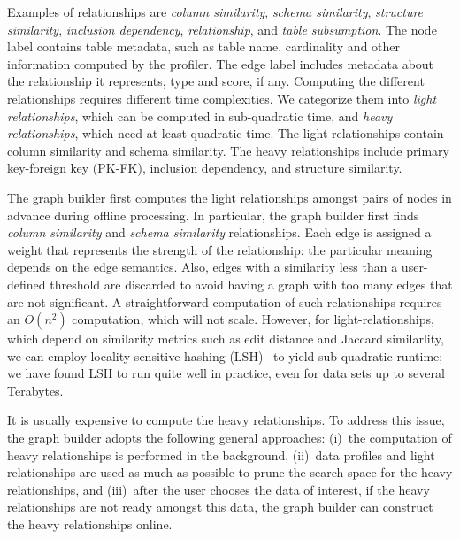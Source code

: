 Examples of relationships are 
\emph{column similarity}, 
\emph{schema similarity}, 
\emph{structure similarity}, %
\emph{inclusion dependency}, 
\emph{\pkfk relationship}, and
\emph{table subsumption}. 
The node label contains table metadata, such as table name, cardinality and
other information computed by the profiler. The edge label includes metadata
about the relationship it represents, \eg type and score, if any. Computing the
different relationships requires different time complexities. We categorize them
into \textit{light relationships}, which can be computed in sub-quadratic time,
and \textit{heavy relationships}, which need at least quadratic time. The light
relationships contain column similarity and schema similarity. The heavy
relationships include primary key-foreign key (PK-FK), inclusion dependency, and structure
similarity. 


The graph builder first computes the light relationships amongst pairs of nodes
in advance during offline processing. In particular, the graph builder first
finds \emph{column similarity} and \emph{schema similarity} relationships.  Each
edge is assigned a weight that represents the strength of the relationship: the
particular meaning depends on the edge semantics. Also, edges with a similarity
less than a user-defined threshold are discarded to avoid having a graph with
too many edges that are not significant.  A straightforward computation of such
relationships requires an $O(n^2)$ computation, which will not scale. However,
for light-relationships, which depend on similarity metrics such as edit
distance and Jaccard similarlity, we can employ locality sensitive hashing
(LSH)~\cite{DBLP:conf/compgeom/DatarIIM04} to yield sub-quadratic runtime; we
have found LSH to run quite well in practice, even for data sets up to several
Terabytes.

It is usually expensive to compute the heavy relationships. To address this
issue, the graph builder adopts the following general approaches: (i)~the
computation of heavy relationships is performed in the background, (ii)~data
profiles and light relationships are used as much as possible to prune the
search space for the heavy relationships, and (iii)~after the user chooses the
data of interest, if the heavy relationships are not ready amongst this data,
the graph builder can construct the heavy relationships online.

